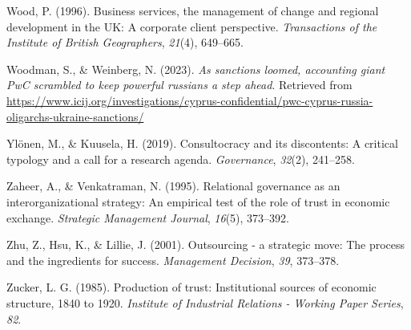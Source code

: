 \documentclass[
  man,floatsintext]{apa6}
\newlength{\cslhangindent}
\newenvironment{CSLReferences}[2] %
 {\begin{list}{}{%
  \setlength{\itemindent}{0pt}
  \setlength{\leftmargin}{0pt}
  \setlength{\parsep}{0pt}
  \ifodd #1
   \setlength{\leftmargin}{\cslhangindent}
   \setlength{\itemindent}{-1\cslhangindent}
  \fi
  \setlength{\itemsep}{#2\baselineskip}}}
 {\end{list}}
\begin{document}
\begin{CSLReferences}{1}{0}
Wood, P. (1996). Business services, the management of change and regional development in the UK: A corporate client perspective. \emph{Transactions of the Institute of British Geographers}, \emph{21}(4), 649--665.

Woodman, S., \& Weinberg, N. (2023). \emph{As sanctions loomed, accounting giant PwC scrambled to keep powerful russians a step ahead}. Retrieved from \url{https://www.icij.org/investigations/cyprus-confidential/pwc-cyprus-russia-oligarchs-ukraine-sanctions/}

Ylönen, M., \& Kuusela, H. (2019). Consultocracy and its discontents: A critical typology and a call for a research agenda. \emph{Governance}, \emph{32}(2), 241--258.

Zaheer, A., \& Venkatraman, N. (1995). Relational governance as an interorganizational strategy: An empirical test of the role of trust in economic exchange. \emph{Strategic Management Journal}, \emph{16}(5), 373--392.

Zhu, Z., Hsu, K., \& Lillie, J. (2001). Outsourcing - a strategic move: The process and the ingredients for success. \emph{Management Decision}, \emph{39}, 373--378.

Zucker, L. G. (1985). Production of trust: Institutional sources of economic structure, 1840 to 1920. \emph{Institute of Industrial Relations - Working Paper Series}, \emph{82}.

\end{CSLReferences}


\clearpage
\renewcommand{\listtablename}{Table captions}
\end{document}
